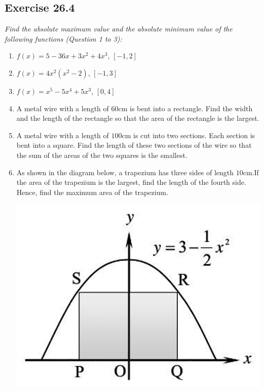 \subsection{Exercise 26.4}

\noindent \hspace{1.2em}\textit{Find the absolute maximum value and the absolute minimum value of the following functions (Question 1 to 3):}
\begin{enumerate}
    \item $f(x)=5-36 x+3 x^2+4 x^3$, $[-1,2]$
    \item $f(x)=4 x^2\left(x^2-2\right)$, $[-1,3]$
    \item $f(x)=x^5-5 x^4+5 x^3$, $[0,4]$
    \item A metal wire with a length of $60$cm is bent into a rectangle. Find the width
          and the length of the rectangle so that the area of the rectangle is the
          largest.
    \item A metal wire with a length of $100$cm is cut into two sections. Each section is
          bent into a square. Find the length of these two sections of the wire so that
          the sum of the areas of the two squares is the smallest.
    \item As shown in the diagram below, a trapezium has three sides of length $10$cm.If
          the area of the trapezium is the largest, find the length of the fourth side.
          Hence, find the maximum area of the trapezium.
          \begin{center}
              \includegraphics[scale=0.25]{assets/26-9.png}
          \end{center}

\end{enumerate}
